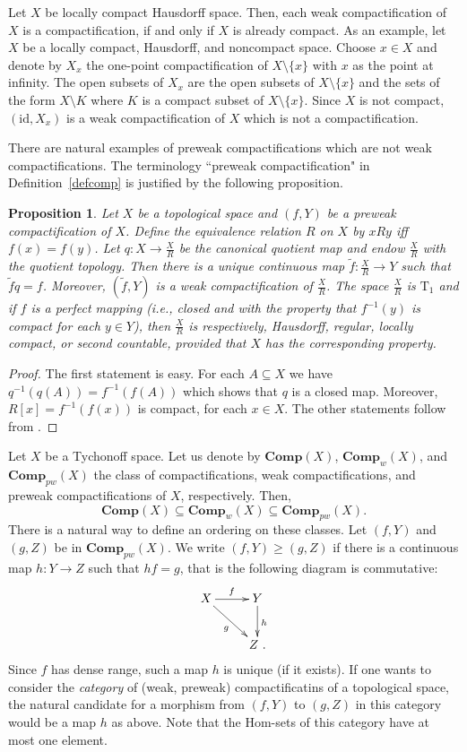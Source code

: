 \documentclass[manuscript]{amsart}
\newtheorem{proposition}[theorem]{Proposition}
\theoremstyle{definition}
\begin{document}
Let $X$ be locally compact Hausdorff space. Then,
each weak compactification of $X$ is a compactification,
if and only if $X$ is already compact. As an example, let $X$ be a locally compact, Hausdorff, and noncompact space.
Choose $x\in X$ and denote by  $X_{x}$ the one-point
compactification of $X\setminus \{x\}$
with $x$ as the point at infinity.
The open subsets of $X_{x}$ are the open subsets of
$X\setminus \{x\}$ and the sets of the form $X\setminus K$ where
$K$ is a compact subset of $X\setminus \{x\}$.
Since $X$ is not compact, $(\mathrm{id},X_{x})$ is a weak compactification of $X$
which is not a compactification.

There are natural examples of preweak compactifications which are not
weak compactifications.
The terminology ``preweak compactification"  in Definition~\ref{defcomp} is justified by the following  proposition.
\begin{proposition}
Let $X$  be a topological space and $(f,Y)$ be a preweak compactification of $X$. Define the equivalence relation
$R$ on $X$ by $xRy$ if{f} $f(x)=f(y)$. Let $q:X\to \frac{X}{R}$ be the canonical quotient map and endow
$\frac{X}{R}$ with the quotient topology. Then there is a unique continuous map
$\tilde{f}: \frac{X}{R}\to Y$ such that $\tilde{f}q=f$.
Moreover, $(\tilde{f},Y)$ is a weak compactification of $\frac{X}{R}$.
The space $\frac{X}{R}$ is $\mathrm{T}_{1}$ and if $f$ is a perfect mapping (i.e., closed and with the property
that $f^{-1}(y)$ is compact for each $y\in Y$),
then $\frac{X}{R}$ is  respectively, Hausdorff, regular, locally compact, or second countable, provided that
$X$ has the corresponding property.
\end{proposition}
\begin{proof}
The first statement is easy. For each $A\subseteq X$ we have
$q^{-1}(q(A))=f^{-1}(f(A))$ which shows that $q$ is a closed map. Moreover, $R[x]=f^{-1}(f(x))$
is compact, for each $x\in X$. The other statements follow from
\cite[Theorems~3.12 and 5.20]{ke75}.
\end{proof}
Let $X$ be a Tychonoff space. Let us denote by $\mathbf{Comp}(X)$,
$\mathbf{Comp}_{w}(X)$, and $\mathbf{Comp}_{pw}(X)$ the class of
 compactifications, weak compactifications, and preweak compactifications
of $X$, respectively. Then,
\[
\mathbf{Comp}(X)\subseteq \mathbf{Comp}_{w}(X)
\subseteq \mathbf{Comp}_{pw}(X).
\]
There is a natural way to define an ordering on these classes.
Let $(f,Y)$ and $(g,Z)$ be in
$\mathbf{Comp}_{pw}(X)$. We write
 $(f,Y)\geq (g,Z)$ if there is a continuous map
$h: Y\to Z$ such that $hf=g$, that is the following diagram is commutative:
\[
\xymatrix{
X \ar[r]^{f} \ar[rd]_{g} & Y\ar[d]^{h}\\
& Z \ .
}
\]
Since $f$ has dense range, such a map $h$ is unique (if it exists).
If one wants to consider the \textit{category} of (weak, preweak) compactificatins of
a topological space, the natural candidate  for a morphism from $(f,Y)$ to
$(g,Z)$ in this category would be a map $h$ as above. Note  that
the Hom-sets of this category have at most one element.
\end{document}

